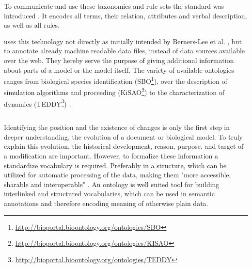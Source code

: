 	To communicate and use these taxonomies and rule sets the \owl standard was introduced \citep{Bechhofer2004,Bechhofer2009}. It encodes all terms, their relation, attributes and verbal description, as well as all rules.
	
	\sysbio uses this technology not directly as initially intended by Berners-Lee et al. \citep{Berners-Lee2001}, but to annotate already machine readable data files, instead of data sources available over the web. They hereby serve the purpose of giving additional information about parts of a model or the model itself. The variety of available ontologies ranges from biological species identification (SBO\footnote{\url{http://bioportal.bioontology.org/ontologies/SBO}}), over the description of simulation algorithms and proceeding (KiSAO\footnote{\url{http://bioportal.bioontology.org/ontologies/KISAO}}) to the characterization of dynamics (TEDDY\footnote{\url{http://bioportal.bioontology.org/ontologies/TEDDY}}) \citep{Courtot2011}.
	
	\begin{comment}
	
	\begin{itemize}
	\item definition
		\subitem formal definition, properties and relation of entities
	\item use of BioOntologies cf. Courtot \citep{Courtot2011}
	\end{itemize}

	\todo{citep owl standard, when explaining comodi import}
	\todo{http://msb.embopress.org/content/7/1/543.short for ontology overview}
	\end{comment}
	\subsection{\comodi}
	\label{sec:background:onto:comodi}
	Identifying the position and the existence of changes is only the first step in deeper understanding, the evolution of a document or biological model. To truly explain this evolution, the historical development, reason, purpose, and target of a modification are important. 
	However, to formalize these information a standardize vocabulary is required. Preferably in a structure, which can be utilized for automatic processing of the data, making them "more accessible, sharable and interoperable" \citep{Scharm2016}.
	An ontology is well suited tool for building interlinked and structured vocabularies, which can be used in semantic annotations and therefore encoding meaning of otherwise plain data.
	
